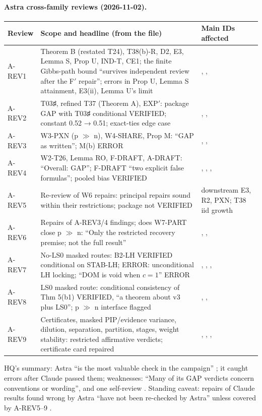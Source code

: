 \paragraph{Astra cross-family reviews (2026-11-02).} 
{\small
\begin{xltabular}{\textwidth}{@{}>{\raggedright\arraybackslash}p{1.4cm}>{\raggedright\arraybackslash}X >{\raggedright\arraybackslash}p{4.6cm}@{}}
\toprule
\textbf{Review} & \textbf{Scope and headline (from the file)} & \textbf{Main IDs affected} \\
\midrule
\endhead
A-REV1 & Theorem B (restated T24), T38(b)-R, D2, E3, Lemma S, Prop U, IND-T, CE1; the finite Gibbs-path bound ``survives independent review after the F$'$ repair''; errors in Prop U, Lemma S attainment, E3(ii), Lemma U's limit & , ,  \\
A-REV2 & T03♯, refined T37 (Theorem A), EXP$'$: package GAP with T03♯ conditional VERIFIED; constant 0.52 → 0.51; exact-ties edge case & , ,  \\
A-REV3 & W3-PXN (p $\gg$ n), W4-SHARE, Prop M: ``GAP as written''; M(b) ERROR & , ,  \\
A-REV4 & W2-T26, Lemma RO, F-DRAFT, A-DRAFT: ``Overall: GAP''; F-DRAFT ``two explicit false formulas''; pooled bias VERIFIED & , , ,  \\
A-REV5 & Re-review of W6 repairs: principal repairs sound within their restrictions; package not VERIFIED & downstream E3, R2, PXN; T38 iid growth \\
A-REV6 & Repairs of A-REV3/4 findings; does W7-PART close p $\gg$ n: ``Only the restricted recovery premise; not the full result'' & , ,  \\
A-REV7 & No-LS0 masked routes: B2-LH VERIFIED conditional on STAB-LH; ERROR: unconditional LH locking; ``DOM is void when $c=1$'' ERROR & , , ,  \\
A-REV8 & LS0 masked route: conditional consistency of Thm 5(b1) VERIFIED, ``a theorem about v3 plus LS0''; p $\gg$ n interface flagged & , ,  \\
A-REV9 & Certificates, masked PIP/evidence variance, dilution, separation, partition, stages, weight stability: restricted affirmative verdicts; certificate card repaired & , , ,  \\
\bottomrule
\end{xltabular}
}
HQ's summary: Astra ``is the most valuable check in the campaign'' ; it caught errors after Claude passed them; weaknesses: ``Many of its GAP verdicts concern conventions or wording'', and one self-review . Standing caveat: repairs of Claude results found wrong by Astra ``have not been re-checked by Astra'' unless covered by A-REV5--9 .

